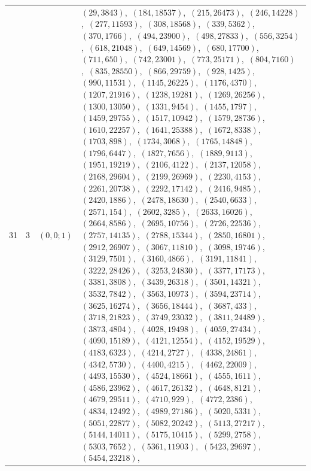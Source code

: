 \documentclass[11pt]{article}
\begin{document}
\begin{longtable}{@{}rrl>{\raggedright\arraybackslash}p{}@{}}
31 & 3 & $(0,0;1)$ & $(29,3843)$,\allowbreak\ $(184,18537)$,\allowbreak\ $(215,26473)$,\allowbreak\ $(246,14228)$,\allowbreak\ $(277,11593)$,\allowbreak\ $(308,18568)$,\allowbreak\ $(339,5362)$,\allowbreak\ $(370,1766)$,\allowbreak\ $(494,23900)$,\allowbreak\ $(498,27833)$,\allowbreak\ $(556,3254)$,\allowbreak\ $(618,21048)$,\allowbreak\ $(649,14569)$,\allowbreak\ $(680,17700)$,\allowbreak\ $(711,650)$,\allowbreak\ $(742,23001)$,\allowbreak\ $(773,25171)$,\allowbreak\ $(804,7160)$,\allowbreak\ $(835,28550)$,\allowbreak\ $(866,29759)$,\allowbreak\ $(928,1425)$,\allowbreak\ $(990,11531)$,\allowbreak\ $(1145,26225)$,\allowbreak\ $(1176,4370)$,\allowbreak\ $(1207,21916)$,\allowbreak\ $(1238,19281)$,\allowbreak\ $(1269,26256)$,\allowbreak\ $(1300,13050)$,\allowbreak\ $(1331,9454)$,\allowbreak\ $(1455,1797)$,\allowbreak\ $(1459,29755)$,\allowbreak\ $(1517,10942)$,\allowbreak\ $(1579,28736)$,\allowbreak\ $(1610,22257)$,\allowbreak\ $(1641,25388)$,\allowbreak\ $(1672,8338)$,\allowbreak\ $(1703,898)$,\allowbreak\ $(1734,3068)$,\allowbreak\ $(1765,14848)$,\allowbreak\ $(1796,6447)$,\allowbreak\ $(1827,7656)$,\allowbreak\ $(1889,9113)$,\allowbreak\ $(1951,19219)$,\allowbreak\ $(2106,4122)$,\allowbreak\ $(2137,12058)$,\allowbreak\ $(2168,29604)$,\allowbreak\ $(2199,26969)$,\allowbreak\ $(2230,4153)$,\allowbreak\ $(2261,20738)$,\allowbreak\ $(2292,17142)$,\allowbreak\ $(2416,9485)$,\allowbreak\ $(2420,1886)$,\allowbreak\ $(2478,18630)$,\allowbreak\ $(2540,6633)$,\allowbreak\ $(2571,154)$,\allowbreak\ $(2602,3285)$,\allowbreak\ $(2633,16026)$,\allowbreak\ $(2664,8586)$,\allowbreak\ $(2695,10756)$,\allowbreak\ $(2726,22536)$,\allowbreak\ $(2757,14135)$,\allowbreak\ $(2788,15344)$,\allowbreak\ $(2850,16801)$,\allowbreak\ $(2912,26907)$,\allowbreak\ $(3067,11810)$,\allowbreak\ $(3098,19746)$,\allowbreak\ $(3129,7501)$,\allowbreak\ $(3160,4866)$,\allowbreak\ $(3191,11841)$,\allowbreak\ $(3222,28426)$,\allowbreak\ $(3253,24830)$,\allowbreak\ $(3377,17173)$,\allowbreak\ $(3381,3808)$,\allowbreak\ $(3439,26318)$,\allowbreak\ $(3501,14321)$,\allowbreak\ $(3532,7842)$,\allowbreak\ $(3563,10973)$,\allowbreak\ $(3594,23714)$,\allowbreak\ $(3625,16274)$,\allowbreak\ $(3656,18444)$,\allowbreak\ $(3687,433)$,\allowbreak\ $(3718,21823)$,\allowbreak\ $(3749,23032)$,\allowbreak\ $(3811,24489)$,\allowbreak\ $(3873,4804)$,\allowbreak\ $(4028,19498)$,\allowbreak\ $(4059,27434)$,\allowbreak\ $(4090,15189)$,\allowbreak\ $(4121,12554)$,\allowbreak\ $(4152,19529)$,\allowbreak\ $(4183,6323)$,\allowbreak\ $(4214,2727)$,\allowbreak\ $(4338,24861)$,\allowbreak\ $(4342,5730)$,\allowbreak\ $(4400,4215)$,\allowbreak\ $(4462,22009)$,\allowbreak\ $(4493,15530)$,\allowbreak\ $(4524,18661)$,\allowbreak\ $(4555,1611)$,\allowbreak\ $(4586,23962)$,\allowbreak\ $(4617,26132)$,\allowbreak\ $(4648,8121)$,\allowbreak\ $(4679,29511)$,\allowbreak\ $(4710,929)$,\allowbreak\ $(4772,2386)$,\allowbreak\ $(4834,12492)$,\allowbreak\ $(4989,27186)$,\allowbreak\ $(5020,5331)$,\allowbreak\ $(5051,22877)$,\allowbreak\ $(5082,20242)$,\allowbreak\ $(5113,27217)$,\allowbreak\ $(5144,14011)$,\allowbreak\ $(5175,10415)$,\allowbreak\ $(5299,2758)$,\allowbreak\ $(5303,7652)$,\allowbreak\ $(5361,11903)$,\allowbreak\ $(5423,29697)$,\allowbreak\ $(5454,23218)$,\allowbreak\ 
\end{longtable}
\end{document}
